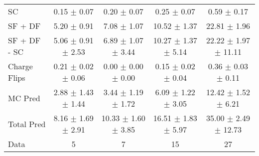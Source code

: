 \begin{tabular}{l|cccc}
                                 SC &  0.15 $\pm$  0.07 &  0.20 $\pm$  0.07 &  0.25 $\pm$  0.07 &  0.59 $\pm$  0.17 \\
                            SF + DF &  5.20 $\pm$  0.91 &  7.08 $\pm$  1.07 & 10.52 $\pm$  1.37 & 22.81 $\pm$  1.96 \\
\hline
                       SF + DF - SC &  5.06 $\pm$  0.91 $\pm$  2.53 &  6.89 $\pm$  1.07 $\pm$  3.44 & 10.27 $\pm$  1.37 $\pm$  5.14 & 22.22 $\pm$  1.97 $\pm$ 11.11 \\
\hline\hline
                       Charge Flips &  0.21 $\pm$  0.02 $\pm$  0.06 &  0.00 $\pm$  0.00 $\pm$  0.00 &  0.15 $\pm$  0.02 $\pm$  0.04 &  0.36 $\pm$  0.03 $\pm$  0.11 \\
\hline
                            MC Pred &  2.88 $\pm$  1.43 $\pm$  1.44 &  3.44 $\pm$  1.19 $\pm$  1.72 &  6.09 $\pm$  1.22 $\pm$  3.05 & 12.42 $\pm$  1.52 $\pm$  6.21 \\
\hline
                         Total Pred &  8.16 $\pm$  1.69 $\pm$  2.91 & 10.33 $\pm$  1.60 $\pm$  3.85 & 16.51 $\pm$  1.83 $\pm$  5.97 & 35.00 $\pm$  2.49 $\pm$ 12.73 \\
\hline\hline
                               Data &     5 &     7 &    15 &    27 \\
\hline\hline
\end{tabular}


